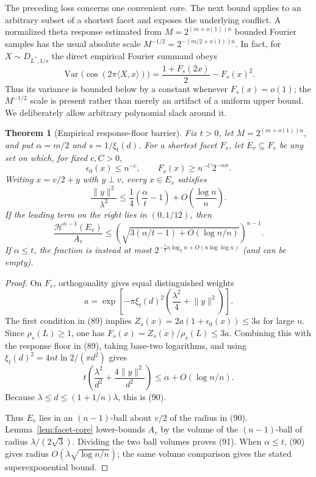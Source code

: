 \documentclass[10pt]{article}
\newtheorem{theorem}{Theorem}[section]
\theoremstyle{definition}
\newcommand{\ip}[2]{\langle #1,#2\rangle}
\newcommand{\norm}[1]{\lVert #1\rVert}
\begin{document}
The preceding loss concerns one convenient core.  The next bound applies
to an arbitrary subset of a shortest facet and exposes the underlying
conflict.  A normalized theta response estimated from
$M=2^{(m+o(1))n}$ bounded Fourier samples has the usual absolute scale
$M^{-1/2}=2^{-(m/2+o(1))n}$.  In fact, for
$X\sim D_{L^*,1/s}$ the direct empirical Fourier summand obeys
\[
 \operatorname{Var}\bigl(\cos(2\pi\ip Xx)\bigr)
 =\frac{1+F_s(2x)}2-F_s(x)^2.
\]
Thus its variance is bounded below by a constant whenever $F_s(x)=o(1)$;
the $M^{-1/2}$ scale is present rather than merely an artifact of a uniform
upper bound.  We deliberately allow arbitrary polynomial slack around it.

\begin{theorem}[Empirical response-floor barrier]              \label{thm:response-barrier}
Fix $t>0$, let $M=2^{(m+o(1))n}$, and put $\alpha=m/2$ and
$s=1/\xi_t(d)$.  For a shortest facet $F_v$, let $E_v\subseteq F_v$ be any
set on which, for fixed $c,C>0$,
\[
 \epsilon_0(x)\le n^{-c},\qquad
 F_s(x)\ge n^{-C}2^{-\alpha n}.                               \tag{89}
\]
Writing $x=v/2+y$ with $y\perp v$, every $x\in E_v$ satisfies
\[
 \frac{\norm{y}^2}{\lambda^2}
 \le\frac14\left(\frac{\alpha}{t}-1\right)
       +O\left(\frac{\log n}{n}\right).                       \tag{90}
\]
If the leading term on the right lies in $(0,1/12)$, then
\[
 \frac{\mathcal H^{n-1}(E_v)}{A_v}
 \le
 \left(\sqrt{3(\alpha/t-1)+O(\log n/n)}\right)^{n-1}.          \tag{91}
\]
If $\alpha\le t$, the fraction is instead at most
$2^{-\frac12n\log_2 n+O(n\log\log n)}$ (and can be empty).
\end{theorem}

\begin{proof}
On $F_v$, orthogonality gives equal distinguished weights
\[
 a=\exp\left[-\pi\xi_t(d)^2
       \left(\frac{\lambda^2}{4}+\norm{y}^2\right)\right].
\]
The first condition in (89) implies $Z_s(x)=2a(1+\epsilon_0(x))\le3a$ for
large $n$.  Since $\rho_s(L)\ge1$, one has $F_s(x)=Z_s(x)/\rho_s(L)\le3a$.
Combining this with the response floor in (89), taking base-two logarithms,
and using $\xi_t(d)^2=4nt\ln2/(\pi d^2)$ gives
\[
 t\left(\frac{\lambda^2}{d^2}
       +\frac{4\norm{y}^2}{d^2}\right)
 \le\alpha+O(\log n/n).
\]
Because $\lambda\le d\le(1+1/n)\lambda$, this is (90).

Thus $E_v$ lies in an $(n-1)$-ball about $v/2$ of the radius in (90).
Lemma~\ref{lem:facet-core} lower-bounds $A_v$ by the volume of the
$(n-1)$-ball of radius $\lambda/(2\sqrt3)$.  Dividing the two ball volumes
proves (91).  When $\alpha\le t$, (90) gives radius
$O(\lambda\sqrt{\log n/n})$; the same volume comparison gives the stated
superexponential bound.
\end{proof}
\end{document}
